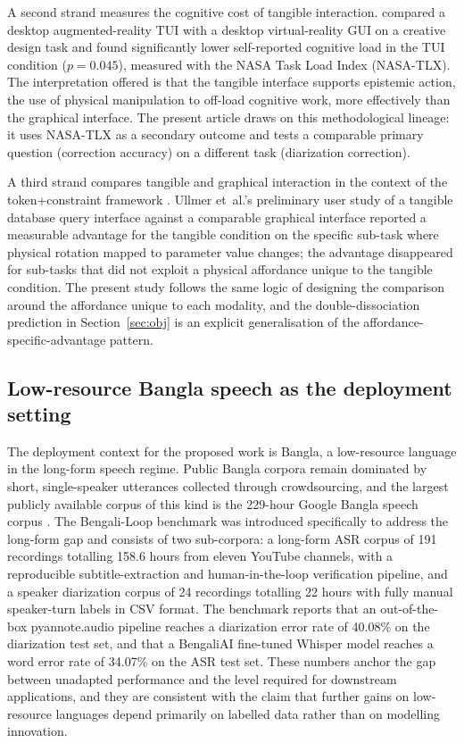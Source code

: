\documentclass[10pt,a4paper,twocolumn]{article}
\begin{document}
A second strand measures the cognitive cost of tangible
interaction. \citet{chandrasekera2015cogload} compared a
desktop augmented-reality TUI with a desktop virtual-reality
GUI on a creative design task and found significantly lower
self-reported cognitive load in the TUI condition
($p = 0.045$), measured with the NASA Task Load Index
(NASA-TLX). The interpretation offered is that the tangible
interface supports epistemic action, the use of physical
manipulation to off-load cognitive work, more effectively than
the graphical interface. The present article draws on this
methodological lineage: it uses NASA-TLX as a secondary
outcome and tests a comparable primary question (correction
accuracy) on a different task (diarization correction).

A third strand compares tangible and graphical interaction in
the context of the token+constraint framework
\citep{ullmer2003tangiblequery, ullmer2005tokenconstraint}.
Ullmer et~al.'s preliminary user study of a tangible database
query interface against a comparable graphical interface
reported a measurable advantage for the tangible condition on
the specific sub-task where physical rotation mapped to
parameter value changes; the advantage disappeared for
sub-tasks that did not exploit a physical affordance unique to
the tangible condition. The present study follows the same
logic of designing the comparison around the affordance unique
to each modality, and the double-dissociation prediction in
Section~\ref{sec:obj} is an explicit generalisation of the
affordance-specific-advantage pattern.

\subsection{Low-resource Bangla speech as the deployment setting}
\label{sec:lit-bangla}

The deployment context for the proposed work is Bangla, a
low-resource language in the long-form speech regime. Public
Bangla corpora remain dominated by short, single-speaker
utterances collected through crowdsourcing, and the largest
publicly available corpus of this kind is the 229-hour Google
Bangla speech corpus \citep{kjartansson2018crowdsourced}. The Bengali-Loop benchmark
\citep{tabib2026bengaliloop} was introduced specifically to
address the long-form gap and consists of two sub-corpora: a
long-form ASR corpus of 191 recordings totalling 158.6 hours
from eleven YouTube channels, with a reproducible
subtitle-extraction and human-in-the-loop verification pipeline,
and a speaker diarization corpus of 24 recordings totalling 22
hours with fully manual speaker-turn labels in CSV format. The
benchmark reports that an out-of-the-box pyannote.audio pipeline
reaches a diarization error rate of 40.08\% on the diarization
test set, and that a BengaliAI fine-tuned Whisper model reaches
a word error rate of 34.07\% on the ASR test set. These numbers
anchor the gap between unadapted performance and the level
required for downstream applications, and they are consistent
with the claim that further gains on low-resource languages
depend primarily on labelled data rather than on modelling
innovation.
\end{document}
